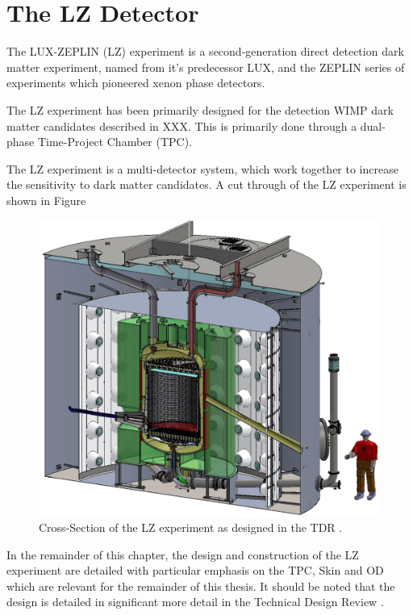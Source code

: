 \section{The LZ Detector}
\par
The LUX-ZEPLIN (LZ) experiment is a second-generation direct detection dark matter experiment, named from it's predecessor LUX, and the ZEPLIN series of experiments which pioneered xenon phase detectors.

The LZ experiment has been primarily designed for the detection WIMP dark matter candidates described in XXX. 
This is primarily done through a dual-phase Time-Project Chamber (TPC).

\par
The LZ experiment is a multi-detector system, which work together to increase the sensitivity to dark matter candidates.
A cut through of the LZ experiment is shown in Figure 

\begin{figure}
    \centering
    \includegraphics[width=\textwidth]{Figures/LZ/LZ_Cut_CAD.jpg}
    \caption{Cross-Section of the LZ experiment as designed in the TDR \cite{LZ_TechnicalDesignReview_ref}.}
    \label{fig:LZ_Cut_CAD}
\end{figure}



\par
In the remainder of this chapter, the design and construction of the LZ experiment are detailed with particular emphasis on the TPC, Skin and OD which are relevant for the remainder of this thesis. 
It should be noted that the design is detailed in significant more detail in the Technical Design Review \cite{LZ_TechnicalDesignReview_ref}.

